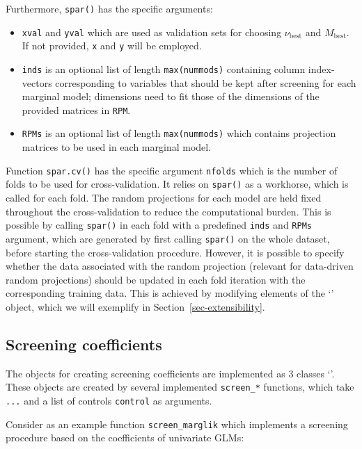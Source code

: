 \documentclass[
  article]{jss}
\newcommand{\class}[1]{`\code{#1}'}
\begin{document}
Furthermore, \texttt{spar()} has the specific arguments:

\begin{itemize}
\item
  \texttt{xval} and \texttt{yval} which are used as validation sets for
  choosing \(\nu_\text{best}\) and \(M_\text{best}\). If not provided,
  \texttt{x} and \texttt{y} will be employed.
\item
  \texttt{inds} is an optional list of length \texttt{max(nummods)}
  containing column index-vectors corresponding to variables that should
  be kept after screening for each marginal model; dimensions need to
  fit those of the dimensions of the provided matrices in \texttt{RPM}.
\item
  \texttt{RPMs} is an optional list of length \texttt{max(nummods)}
  which contains projection matrices to be used in each marginal model.
\end{itemize}

Function \texttt{spar.cv()} has the specific argument \texttt{nfolds}
which is the number of folds to be used for cross-validation. It relies
on \texttt{spar()} as a workhorse, which is called for each fold. The
random projections for each model are held fixed throughout the
cross-validation to reduce the computational burden. This is possible by
calling \texttt{spar()} in each fold with a predefined \texttt{inds} and
\texttt{RPMs} argument, which are generated by first calling
\texttt{spar()} on the whole dataset, before starting the
cross-validation procedure. However, it is possible to specify whether
the data associated with the random projection (relevant for data-driven
random projections) should be updated in each fold iteration with the
corresponding training data. This is achieved by modifying elements of
the \class{randomprojection} object, which we will exemplify in
Section~\ref{sec-extensibility}.

\subsection{Screening coefficients}\label{screening-coefficients}

The objects for creating screening coefficients are implemented as
3 classes \class{screencoef}. These objects are created by
several implemented \texttt{screen\_*} functions, which take
\texttt{...} and a list of controls \texttt{control} as arguments.

Consider as an example function \texttt{screen\_marglik} which
implements a screening procedure based on the coefficients of univariate
GLMs:
\end{document}
